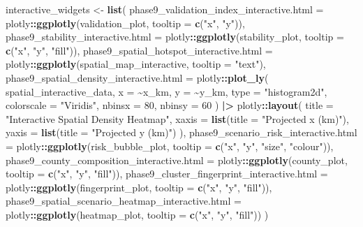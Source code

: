 \documentclass[
]{article}
\newenvironment{Shaded}{\begin{snugshade}}{\end{snugshade}}
\newcommand{\AttributeTok}[1]{\textcolor[rgb]{0.13,0.29,0.53}{#1}}
\newcommand{\DecValTok}[1]{\textcolor[rgb]{0.00,0.00,0.81}{#1}}
\newcommand{\FunctionTok}[1]{\textcolor[rgb]{0.13,0.29,0.53}{\textbf{#1}}}
\newcommand{\NormalTok}[1]{#1}
\newcommand{\OtherTok}[1]{\textcolor[rgb]{0.56,0.35,0.01}{#1}}
\newcommand{\SpecialCharTok}[1]{\textcolor[rgb]{0.81,0.36,0.00}{\textbf{#1}}}
\newcommand{\StringTok}[1]{\textcolor[rgb]{0.31,0.60,0.02}{#1}}
\begin{document}
\begin{Shaded}
\begin{Highlighting}[]
\NormalTok{  interactive\_widgets }\OtherTok{\textless{}{-}} \FunctionTok{list}\NormalTok{(}
    \AttributeTok{phase9\_validation\_index\_interactive.html =}\NormalTok{ plotly}\SpecialCharTok{::}\FunctionTok{ggplotly}\NormalTok{(validation\_plot, }\AttributeTok{tooltip =} \FunctionTok{c}\NormalTok{(}\StringTok{"x"}\NormalTok{, }\StringTok{"y"}\NormalTok{)),}
    \AttributeTok{phase9\_stability\_interactive.html =}\NormalTok{ plotly}\SpecialCharTok{::}\FunctionTok{ggplotly}\NormalTok{(stability\_plot, }\AttributeTok{tooltip =} \FunctionTok{c}\NormalTok{(}\StringTok{"x"}\NormalTok{, }\StringTok{"y"}\NormalTok{, }\StringTok{"fill"}\NormalTok{)),}
    \AttributeTok{phase9\_spatial\_hotspot\_interactive.html =}\NormalTok{ plotly}\SpecialCharTok{::}\FunctionTok{ggplotly}\NormalTok{(spatial\_map\_interactive, }\AttributeTok{tooltip =} \StringTok{"text"}\NormalTok{),}
    \AttributeTok{phase9\_spatial\_density\_interactive.html =}\NormalTok{ plotly}\SpecialCharTok{::}\FunctionTok{plot\_ly}\NormalTok{(}
\NormalTok{      spatial\_interactive\_data,}
      \AttributeTok{x =} \SpecialCharTok{\textasciitilde{}}\NormalTok{x\_km,}
      \AttributeTok{y =} \SpecialCharTok{\textasciitilde{}}\NormalTok{y\_km,}
      \AttributeTok{type =} \StringTok{"histogram2d"}\NormalTok{,}
      \AttributeTok{colorscale =} \StringTok{"Viridis"}\NormalTok{,}
      \AttributeTok{nbinsx =} \DecValTok{80}\NormalTok{,}
      \AttributeTok{nbinsy =} \DecValTok{60}
\NormalTok{    ) }\SpecialCharTok{|\textgreater{}}
\NormalTok{      plotly}\SpecialCharTok{::}\FunctionTok{layout}\NormalTok{(}
        \AttributeTok{title =} \StringTok{"Interactive Spatial Density Heatmap"}\NormalTok{,}
        \AttributeTok{xaxis =} \FunctionTok{list}\NormalTok{(}\AttributeTok{title =} \StringTok{"Projected x (km)"}\NormalTok{),}
        \AttributeTok{yaxis =} \FunctionTok{list}\NormalTok{(}\AttributeTok{title =} \StringTok{"Projected y (km)"}\NormalTok{)}
\NormalTok{      ),}
    \AttributeTok{phase9\_scenario\_risk\_interactive.html =}\NormalTok{ plotly}\SpecialCharTok{::}\FunctionTok{ggplotly}\NormalTok{(risk\_bubble\_plot, }\AttributeTok{tooltip =} \FunctionTok{c}\NormalTok{(}\StringTok{"x"}\NormalTok{, }\StringTok{"y"}\NormalTok{, }\StringTok{"size"}\NormalTok{, }\StringTok{"colour"}\NormalTok{)),}
    \AttributeTok{phase9\_county\_composition\_interactive.html =}\NormalTok{ plotly}\SpecialCharTok{::}\FunctionTok{ggplotly}\NormalTok{(county\_plot, }\AttributeTok{tooltip =} \FunctionTok{c}\NormalTok{(}\StringTok{"x"}\NormalTok{, }\StringTok{"y"}\NormalTok{, }\StringTok{"fill"}\NormalTok{)),}
    \AttributeTok{phase9\_cluster\_fingerprint\_interactive.html =}\NormalTok{ plotly}\SpecialCharTok{::}\FunctionTok{ggplotly}\NormalTok{(fingerprint\_plot, }\AttributeTok{tooltip =} \FunctionTok{c}\NormalTok{(}\StringTok{"x"}\NormalTok{, }\StringTok{"y"}\NormalTok{, }\StringTok{"fill"}\NormalTok{)),}
    \AttributeTok{phase9\_spatial\_scenario\_heatmap\_interactive.html =}\NormalTok{ plotly}\SpecialCharTok{::}\FunctionTok{ggplotly}\NormalTok{(heatmap\_plot, }\AttributeTok{tooltip =} \FunctionTok{c}\NormalTok{(}\StringTok{"x"}\NormalTok{, }\StringTok{"y"}\NormalTok{, }\StringTok{"fill"}\NormalTok{))}
\NormalTok{  )}


\end{Highlighting}
\end{Shaded}
\end{document}
